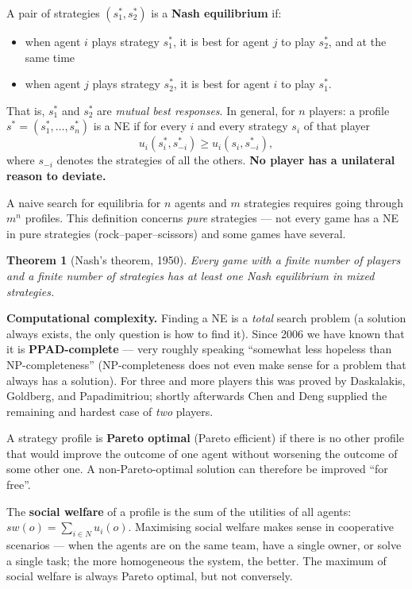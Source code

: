 \documentclass[11pt,a4paper]{article}
\newtheorem{theorem}{Theorem}[section]
\theoremstyle{definition}
\providecommand{\uv}[1]{``#1''}
\begin{document}
\begin{defbox}
A pair of strategies $(s_1^*, s_2^*)$ is a \textbf{Nash equilibrium} if:
\begin{itemize}
\item when agent $i$ plays strategy $s_1^*$, it is best for agent $j$ to play $s_2^*$, and at the same
  time
\item when agent $j$ plays strategy $s_2^*$, it is best for agent $i$ to play $s_1^*$.
\end{itemize}
That is, $s_1^*$ and $s_2^*$ are \emph{mutual best responses}.
In general, for $n$ players: a profile $s^* = (s_1^*,\dots,s_n^*)$ is a NE if for every $i$ and every
strategy $s_i$ of that player
\[
u_i(s_i^*, s_{-i}^*) \ge u_i(s_i, s_{-i}^*),
\]
where $s_{-i}$ denotes the strategies of all the others. \textbf{No player has a unilateral reason to
deviate.}

A naive search for equilibria for $n$ agents and $m$ strategies requires going through $m^n$ profiles.
This definition concerns \emph{pure} strategies --- not every game has a NE in pure strategies
(rock--paper--scissors) and some games have several.
\end{defbox}

\begin{theorem}[Nash's theorem, 1950]
Every game with a finite number of players and a finite number of strategies has at least one Nash
equilibrium \emph{in mixed strategies}.
\end{theorem}

\textbf{Computational complexity.} Finding a NE is a \emph{total} search problem (a solution always
exists, the only question is how to find it). Since 2006 we have known that it is
\textbf{PPAD-complete} --- very roughly speaking \uv{somewhat less hopeless than NP-completeness}
(NP-completeness does not even make sense for a problem that always has a solution). For three and more
players this was proved by Daskalakis, Goldberg, and Papadimitriou; shortly afterwards Chen and Deng
supplied the remaining and hardest case of \emph{two} players.

\begin{defbox}
A strategy profile is \textbf{Pareto optimal} (Pareto efficient) if there is no other profile that
would improve the outcome of one agent without worsening the outcome of some other one.
A non-Pareto-optimal solution can therefore be improved \uv{for free}.

The \textbf{social welfare} of a profile is the sum of the utilities of all agents:
$\mathit{sw}(o) = \sum_{i \in N} u_i(o)$. Maximising social welfare makes sense
in cooperative scenarios --- when the agents are on the same team, have a single owner, or solve a
single task; the more homogeneous the system, the better. The maximum of social welfare is always
Pareto optimal, but not conversely.
\end{defbox}
\end{document}
